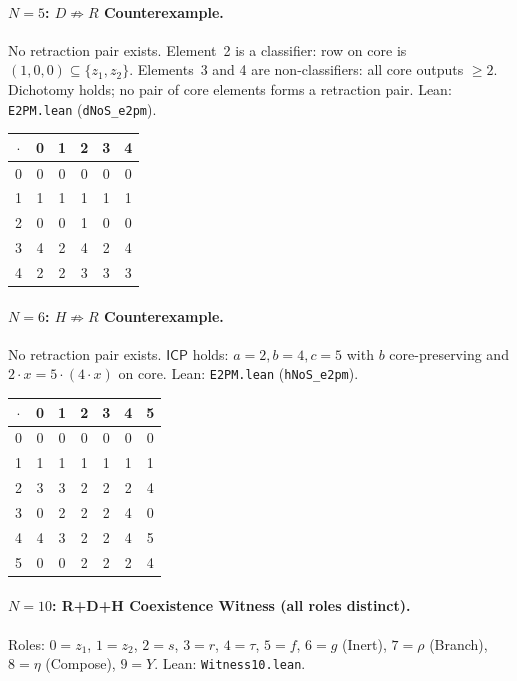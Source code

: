 \documentclass[a4paper,UKenglish,cleveref,autoref,thm-restate]{lipics-v2021}
\newcommand{\dotop}{\cdot}
\newcommand{\ICP}{\textsf{ICP}}
\begin{document}
\paragraph{$N\!=\!5$: $D \not\Rightarrow R$ Counterexample.}
No retraction pair exists. Element~2 is a classifier: row on core is $(1,0,0) \subseteq \{z_1, z_2\}$. Elements~3 and 4 are non-classifiers: all core outputs $\geq 2$. Dichotomy holds; no pair of core elements forms a retraction pair. \quad Lean: \texttt{E2PM.lean} (\texttt{dNoS\_e2pm}).

\medskip
{\small
\begin{tabular}{c|ccccc}
$\dotop$ & 0 & 1 & 2 & 3 & 4 \\\hline
0 & 0 & 0 & 0 & 0 & 0 \\
1 & 1 & 1 & 1 & 1 & 1 \\
2 & 0 & 0 & 1 & 0 & 0 \\
3 & 4 & 2 & 4 & 2 & 4 \\
4 & 2 & 2 & 3 & 3 & 3 \\
\end{tabular}}

\paragraph{$N\!=\!6$: $H \not\Rightarrow R$ Counterexample.}
No retraction pair exists. $\ICP$ holds: $a\!=\!2, b\!=\!4, c\!=\!5$ with $b$ core-preserving and $2 \dotop x = 5 \dotop (4 \dotop x)$ on core. \quad Lean: \texttt{E2PM.lean} (\texttt{hNoS\_e2pm}).

\medskip
{\small
\begin{tabular}{c|cccccc}
$\dotop$ & 0 & 1 & 2 & 3 & 4 & 5 \\\hline
0 & 0 & 0 & 0 & 0 & 0 & 0 \\
1 & 1 & 1 & 1 & 1 & 1 & 1 \\
2 & 3 & 3 & 2 & 2 & 2 & 4 \\
3 & 0 & 2 & 2 & 2 & 4 & 0 \\
4 & 4 & 3 & 2 & 2 & 4 & 5 \\
5 & 0 & 0 & 2 & 2 & 2 & 4 \\
\end{tabular}}

\paragraph{$N\!=\!10$: R+D+H Coexistence Witness (all roles distinct).}
Roles: $0 = z_1$, $1 = z_2$, $2 = s$, $3 = r$, $4 = \tau$, $5 = f$, $6 = g$ (Inert), $7 = \rho$ (Branch), $8 = \eta$ (Compose), $9 = Y$. \quad Lean: \texttt{Witness10.lean}.
\end{document}
